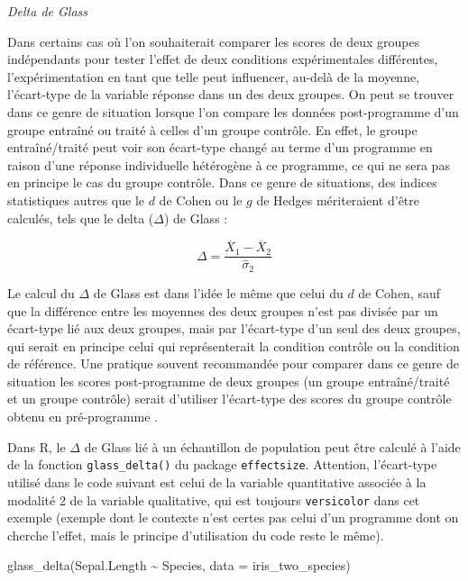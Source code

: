 \documentclass[
]{book}
\newenvironment{Shaded}{\begin{snugshade}}{\end{snugshade}}
\newcommand{\AttributeTok}[1]{\textcolor[rgb]{0.77,0.63,0.00}{#1}}
\newcommand{\FunctionTok}[1]{\textcolor[rgb]{0.00,0.00,0.00}{#1}}
\newcommand{\NormalTok}[1]{#1}
\newcommand{\SpecialCharTok}[1]{\textcolor[rgb]{0.00,0.00,0.00}{#1}}
\begin{document}
\emph{Delta de Glass}

Dans certains cas où l'on souhaiterait comparer les scores de deux groupes indépendants pour tester l'effet de deux conditions expérimentales différentes, l'expérimentation en tant que telle peut influencer, au-delà de la moyenne, l'écart-type de la variable réponse dans un des deux groupes. On peut se trouver dans ce genre de situation lorsque l'on compare les données post-programme d'un groupe entraîné ou traité à celles d'un groupe contrôle. En effet, le groupe entraîné/traité peut voir son écart-type changé au terme d'un programme en raison d'une réponse individuelle hétérogène à ce programme, ce qui ne sera pas en principe le cas du groupe contrôle. Dans ce genre de situations, des indices statistiques autres que le \(d\) de Cohen ou le \(g\) de Hedges mériteraient d'être calculés, tels que le delta (\(\Delta\)) de Glass \autocite{lakensCalculatingReportingEffect2013} :

\[\Delta = \frac{\overline{X}_{1} - \overline{X}_{2}} {\hat{\sigma}_{2}}\]

Le calcul du \(\Delta\) de Glass est dans l'idée le même que celui du \(d\) de Cohen, sauf que la différence entre les moyennes des deux groupes n'est pas divisée par un écart-type lié aux deux groupes, mais par l'écart-type d'un seul des deux groupes, qui serait en principe celui qui représenterait la condition contrôle ou la condition de référence. Une pratique souvent recommandée pour comparer dans ce genre de situation les scores post-programme de deux groupes (un groupe entraîné/traité et un groupe contrôle) serait d'utiliser l'écart-type des scores du groupe contrôle obtenu en pré-programme \autocite{lakensCalculatingReportingEffect2013}.

Dans R, le \(\Delta\) de Glass lié à un échantillon de population peut être calculé à l'aide de la fonction \texttt{glass\_delta()} du package \texttt{effectsize}. Attention, l'écart-type utilisé dans le code suivant est celui de la variable quantitative associée à la modalité 2 de la variable qualitative, qui est toujours \texttt{versicolor} dans cet exemple (exemple dont le contexte n'est certes pas celui d'un programme dont on cherche l'effet, mais le principe d'utilisation du code reste le même).

\begin{Shaded}
\begin{Highlighting}[]
\FunctionTok{glass\_delta}\NormalTok{(Sepal.Length }\SpecialCharTok{\textasciitilde{}}\NormalTok{ Species, }
            \AttributeTok{data =}\NormalTok{ iris\_two\_species)}
\end{Highlighting}
\end{Shaded}
\end{document}
